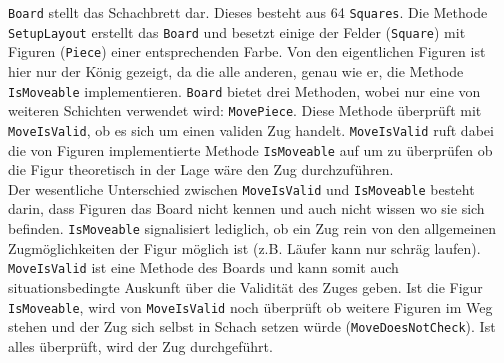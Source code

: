 \documentclass[
10pt, %
a4paper, %
oneside, %
headinclude,footinclude, %
BCOR5mm, %
]{scrartcl}
\begin{document}
\begin{onehalfspace}
\texttt{Board} stellt das Schachbrett dar. Dieses besteht aus 64 \texttt{Squares}. Die Methode \texttt{SetupLayout} erstellt das \texttt{Board} und besetzt einige der Felder (\texttt{Square}) mit Figuren (\texttt{Piece}) einer entsprechenden Farbe.
Von den eigentlichen Figuren ist hier nur der König gezeigt, da die alle anderen, genau wie er, die Methode \texttt{IsMoveable} implementieren. 
\texttt{Board} bietet drei Methoden, wobei nur eine von weiteren Schichten verwendet wird: \texttt{MovePiece}. Diese Methode überprüft mit \texttt{MoveIsValid}, ob es sich um einen validen Zug handelt. \texttt{MoveIsValid} ruft dabei die von Figuren implementierte Methode \texttt{IsMoveable} auf um zu überprüfen ob die Figur theoretisch in der Lage wäre den Zug durchzuführen.\\ 
Der wesentliche Unterschied zwischen \texttt{MoveIsValid} und \texttt{IsMoveable} besteht darin, dass Figuren das Board nicht kennen und auch nicht wissen wo sie sich befinden. \texttt{IsMoveable} signalisiert lediglich, ob ein Zug rein von den allgemeinen Zugmöglichkeiten der Figur möglich ist (z.B. Läufer kann nur schräg laufen). \texttt{MoveIsValid} ist eine Methode des Boards und kann somit auch situationsbedingte Auskunft über die Validität des Zuges geben. Ist die Figur \texttt{IsMoveable}, wird von \texttt{MoveIsValid} noch überprüft ob weitere Figuren im Weg stehen und der Zug sich selbst in Schach setzen würde (\texttt{MoveDoesNotCheck}). Ist alles überprüft, wird der Zug durchgeführt.


\end{onehalfspace}
\end{document}
